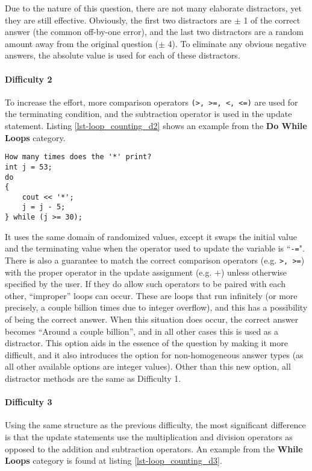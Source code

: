 \documentclass{article}
\begin{document}
Due to the nature of this question, there are not many elaborate distractors, yet they are still effective. Obviously, the first two distractors are $\pm$ 1 of the correct answer (the common 
off-by-one error), and the last two distractors are a random amount away from the original question ($\pm$ 4). To eliminate any obvious negative answers, the absolute value is used for each of these distractors. 

\paragraph{Difficulty 2} \hfill \par
To increase the effort, more comparison operators \verb;(>, >=, <, <=); are used for the terminating condition, and the subtraction operator is used in the update
statement. Listing \ref{lst-loop_counting_d2} shows an example from the \textbf{Do While Loops} category.

\begin{lstlisting}[caption={Loop Counting Difficulty 2 Example}, label=lst-loop_counting_d2]
How many times does the '*' print? 
int j = 53;
do 
{
	cout << '*'; 
	j = j - 5; 
} while (j >= 30); 
\end{lstlisting}


 It uses the same domain of randomized values, except it swaps the initial value and the terminating value when the operator used to update the variable is ``\verb;-=;". There is also a 
guarantee to match the correct comparison operators (e.g. \verb;>, >=;) with the proper operator in the update assignment (e.g. +) unless otherwise specified by the user.
If they do allow such operators to be paired with each other, ``improper'' loops can occur. These are loops that run infinitely (or more precisely, a couple billion times due to integer overflow), 
and this has a possibility of being the correct answer. When this situation does occur, the correct answer becomes ``Around a couple billion'', and in all other cases this is used as a distractor. This 
option aids in the essence of the question by making it more difficult, and it also introduces the option for non-homogeneous answer types (as all other available options are integer values). 
Other than this new option, all distractor methods are the same as Difficulty 1.

\paragraph{Difficulty 3} \hfill \par 
Using the same structure as the previous difficulty, the most significant difference is that the update statements use the multiplication and division operators as opposed to the addition
and subtraction operators. An example from the \textbf{While Loops} category is found at listing \ref{lst-loop_counting_d3}.
\end{document}
